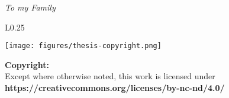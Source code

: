 \vfill
\begin{flushright}
    \vfill
	\hfill
	\emph{To my Family}\\
	\vfill
\end{flushright}
\mbox{}
\vfill
\begin{wrapfigure}{L}{0.25\textwidth}
    \begin{center}
        \vspace{-\baselineskip}
        \texttt{[image: figures/thesis-copyright.png]}
    \end{center}
\end{wrapfigure}
\noindent
\textbf{Copyright:}\\
Except where otherwise noted,
this work is licensed under\\
\textbf{https://creativecommons.org/licenses/by-nc-nd/4.0/}